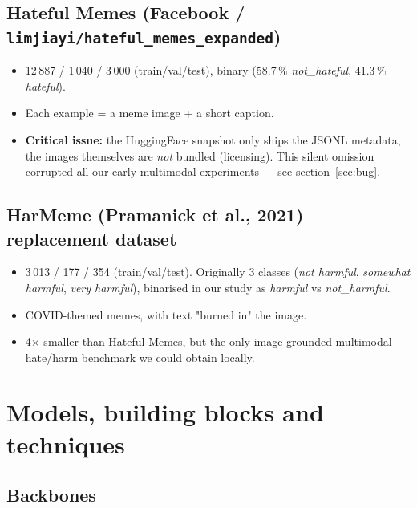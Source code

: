 \documentclass[11pt,a4paper]{article}
\begin{document}
\subsection{Hateful Memes (Facebook / \texttt{limjiayi/hateful\_memes\_expanded})}

\begin{itemize}[leftmargin=*]
    \item 12\,887 / 1\,040 / 3\,000 (train/val/test), binary (58.7\,\% \emph{not\_hateful},
    41.3\,\% \emph{hateful}).
    \item Each example = a meme image + a short caption.
    \item \textbf{Critical issue:} the HuggingFace snapshot only ships the JSONL
    metadata, the images themselves are \emph{not} bundled (licensing). This silent
    omission corrupted all our early multimodal experiments --- see
    section~\ref{sec:bug}.
\end{itemize}

\subsection{HarMeme (Pramanick et al., 2021) --- replacement dataset}

\begin{itemize}[leftmargin=*]
    \item 3\,013 / 177 / 354 (train/val/test). Originally 3 classes
    (\emph{not harmful}, \emph{somewhat harmful}, \emph{very harmful}), binarised
    in our study as \emph{harmful} vs \emph{not\_harmful}.
    \item COVID-themed memes, with text "burned in" the image.
    \item 4$\times$ smaller than Hateful Memes, but the only image-grounded
    multimodal hate/harm benchmark we could obtain locally.
\end{itemize}

\section{Models, building blocks and techniques}

\subsection{Backbones}
\end{document}

